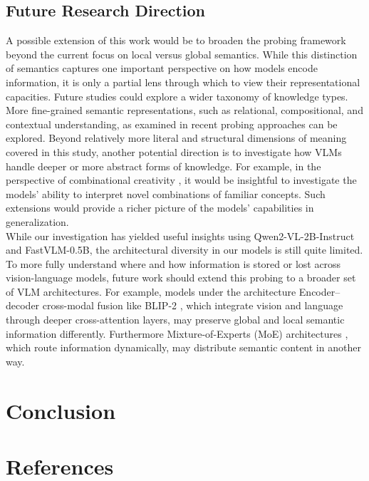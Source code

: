 \documentclass[11pt]{article}
\begin{document}
\subsection{Future Research Direction}
A possible extension of this work would be to broaden the probing framework beyond the current focus on local versus global semantics.
While this distinction of semantics captures one important perspective on how models encode information, it is only a partial lens through which to view their representational capacities.
Future studies could explore a wider taxonomy of knowledge types.
More fine-grained semantic representations, such as relational, compositional, and contextual understanding, as examined in recent probing approaches \cite{schiappa2023ProbingConceptualUnderstanding} can be explored.
Beyond relatively more literal and structural dimensions of meaning covered in this study, another potential direction is to investigate how VLMs handle deeper or more abstract forms of knowledge.
For example, in the perspective of combinational creativity \cite{peng2025ProbingandInducingCombinationalCreativity}, it would be insightful to investigate the models' ability to interpret novel combinations of familiar concepts. Such extensions would provide a richer picture of the models’ capabilities in generalization. \\

While our investigation has yielded useful insights using Qwen2-VL-2B-Instruct and FastVLM-0.5B, the architectural diversity in our models is still quite limited.
To more fully understand where and how information is stored or lost across vision-language models, future work should extend this probing to a broader set of VLM architectures.
For example, models under the architecture Encoder–decoder cross-modal fusion like BLIP-2 \cite{li2023BLIP2}, which integrate vision and language through deeper cross-attention layers, may preserve global and local semantic information differently.
Furthermore Mixture-of-Experts (MoE) architectures \cite{lin2024MoELLaVA}, which route information dynamically, may distribute semantic content in another way.


\section{Conclusion}

\section{References}


\nocite{*}
\appendix
\end{document}
